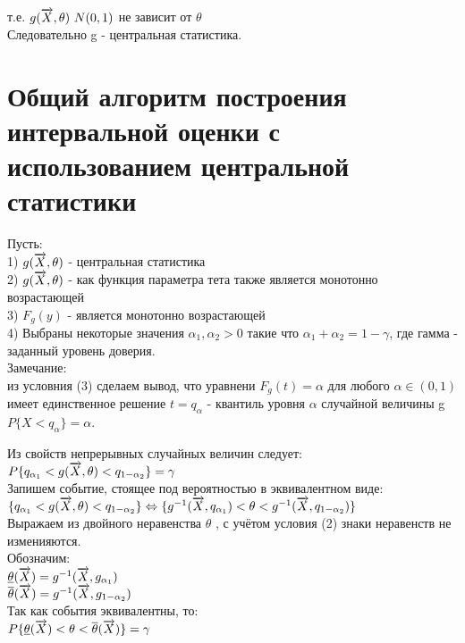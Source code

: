 т.е. $g(\overrightarrow{X}, \theta) ~ N(0, 1)$ не зависит от $\theta$\\
Следовательно g - центральная статистика.

\section{Общий алгоритм построения интервальной оценки с использованием центральной статистики}
Пусть:\\
1) $g(\overrightarrow{X}, \theta)$ - центральная статистика\\
2) $g(\overrightarrow{X}, \theta)$ - как функция параметра тета также является монотонно возрастающей\\
3) $F_g(y)$ - является монотонно возрастающей\\
4) Выбраны некоторые значения $\alpha_1, \alpha_2 > 0$ такие что $\alpha_1 + \alpha_2 = 1 - \gamma$, где гамма - заданный уровень доверия.\\

Замечание:\\
из условния (3) сделаем вывод, что уравнени $F_g(t) = \alpha$ для любого $\alpha \in (0, 1)$ имеет единственное решение $t = q_\alpha$ - квантиль уровня $\alpha$ случайной величины g $P\{X < q_\alpha\}=\alpha$.

\begin{figure}[H]
	\center{\texttt{[image: 9\_1]}}
\end{figure}

\begin{figure}[H]
	\center{\texttt{[image: 9\_2]}}
\end{figure}

Из свойств непрерывных случайных величин следует: $P\{q_{\alpha_1} < g(\overrightarrow{X}, \theta) < q_{1 - \alpha_2}\} = \gamma$\\

Запишем событие, стоящее под вероятностью в эквивалентном виде:\\
$\{q_{\alpha_1} < g(\overrightarrow{X}, \theta) < q_{1 - \alpha_2}\} \Leftrightarrow \{g^{-1}(\overrightarrow{X}, q_{\alpha_1}) < \theta < g^{-1}(\overrightarrow{X}, q_{1 - \alpha_2})\}$\\
Выражаем из двойного неравенства $\theta$ , с учётом условия (2) знаки неравенств не изменияются.\\

Обозначим:\\
$\underline{\theta}(\overrightarrow{X}) = g^{-1}(\overrightarrow{X}, g_{\alpha_{1}})$\\
$\overline{\theta}(\overrightarrow{X}) = g^{-1}(\overrightarrow{X}, g_{1 - \alpha_{2}})$\\
Так как события эквивалентны, то:\\
$P\{\underline{\theta}(\overrightarrow{X}) < \theta < \overline{\theta}(\overrightarrow{X})\} = \gamma$\\


